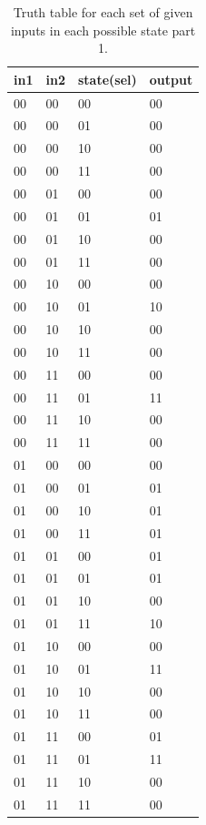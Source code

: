 \documentclass[11pt]{article}
\begin{document}
\begin{table}[H]
\begin{center}
\begin{tabular}{| l | l | l | l |}
	\hline
	in1 & in2 & state(sel) & output \\ \hline
	00 & 00 & 00 & 00 \\ \hline
	00 & 00 & 01 & 00 \\ \hline
	00 & 00 & 10 & 00 \\ \hline
	00 & 00 & 11 & 00 \\ \hline
	00 & 01 & 00 & 00 \\ \hline
	00 & 01 & 01 & 01 \\ \hline
	00 & 01 & 10 & 00 \\ \hline
	00 & 01 & 11 & 00 \\ \hline
	00 & 10 & 00 & 00 \\ \hline
	00 & 10 & 01 & 10 \\ \hline
	00 & 10 & 10 & 00 \\ \hline
	00 & 10 & 11 & 00 \\ \hline
	00 & 11 & 00 & 00 \\ \hline
	00 & 11 & 01 & 11 \\ \hline
	00 & 11 & 10 & 00 \\ \hline
	00 & 11 & 11 & 00 \\ \hline
	01 & 00 & 00 & 00 \\ \hline
	01 & 00 & 01 & 01 \\ \hline
	01 & 00 & 10 & 01 \\ \hline
	01 & 00 & 11 & 01 \\ \hline
	01 & 01 & 00 & 01 \\ \hline
	01 & 01 & 01 & 01 \\ \hline
	01 & 01 & 10 & 00 \\ \hline
	01 & 01 & 11 & 10 \\ \hline
	01 & 10 & 00 & 00 \\ \hline
	01 & 10 & 01 & 11 \\ \hline
	01 & 10 & 10 & 00 \\ \hline
	01 & 10 & 11 & 00 \\ \hline
	01 & 11 & 00 & 01 \\ \hline
	01 & 11 & 01 & 11 \\ \hline
	01 & 11 & 10 & 00 \\ \hline
	01 & 11 & 11 & 00 \\ \hline
\end{tabular}
\caption{\label{tab:integrated_truth_table1}Truth table for each set of given inputs in each possible state part 1.}
\end{center}
\end{table}
\end{document}
